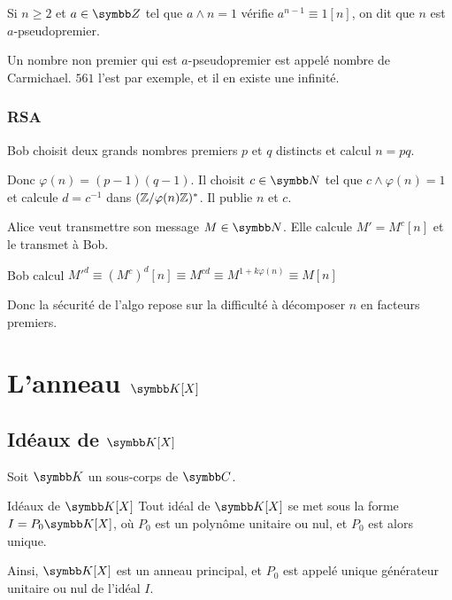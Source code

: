 Si $n \geqslant 2$ et $a \in \Z$ tel que $a \wedge n = 1$ vérifie $a^{n -1} \equiv 1 [n]$,
on dit que $n$ est $a$-pseudopremier.

Un nombre non premier qui est $a$-pseudopremier est appelé nombre de Carmichael. 
$561$ l'est par exemple, et il en existe une infinité. 

\subsubsection{RSA}

Bob choisit deux grands nombres premiers $p$ et $q$ distincts et calcul $n = pq$. 

Donc $\varphi(n) = (p- 1)(q-1)$. Il choisit $c \in \N$ tel que $c \wedge \varphi(n) = 1$ et 
calcule $d = c^{-1}$ dans $(\mathbb{Z}/\varphi(n)\mathbb{Z})^*$. Il publie $n$ et $c$. 

Alice veut transmettre son message $M \in \N$. Elle calcule $M' = M^c [n]$ et le transmet à Bob.

Bob calcul $M'^d \equiv (M^c)^d [n] \equiv M^{cd} \equiv M^{1 + k \varphi(n)} \equiv M[n]$

Donc la sécurité de l'algo repose sur la difficulté à décomposer $n$ en facteurs premiers. 

\section{L'anneau \texorpdfstring{$\K [X]$}{K[X]}}
\subsection{Idéaux de \texorpdfstring{$\K [X]$}{K[X]}}

Soit $\K$ un sous-corps de $\C$.

\begin{theoreme}{Idéaux de $\K[X]$}{}
    Tout idéal de $\K[X]$ se met sous la forme $I = P_0 \K[X]$, où $P_0$ est un polynôme
    unitaire ou nul, et $P_0$ est alors unique.

    Ainsi, $\K[X]$ est un anneau principal, et $P_0$ est appelé unique générateur unitaire 
    ou nul de l'idéal $I$.
\end{theoreme}


